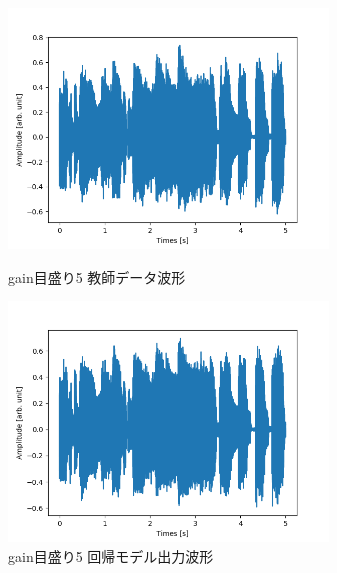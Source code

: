 \documentclass{jreport}		%
\begin{document}
\newpage
\begin{figure}[htbp]
 \begin{minipage}{0.5\hsize}
  \begin{center}
   \includegraphics[width=85mm]{gain5_output.png}
  \end{center}
  \caption{gain目盛り5 教師データ波形}
  \label{fig:one}
 \end{minipage}
 \begin{minipage}{0.5\hsize}
  \begin{center}
   \includegraphics[width=85mm]{gain5_predict_output.png}
  \end{center}
  \caption{gain目盛り5 回帰モデル出力波形}
  \label{fig:two}
 \end{minipage}
\end{figure}
\end{document}
